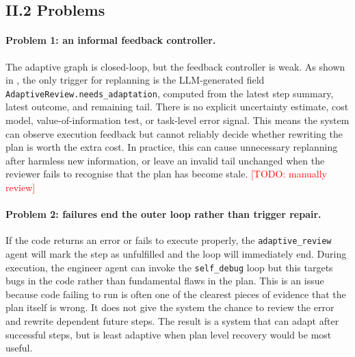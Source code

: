 \documentclass[11pt,a4paper]{article}
\newcommand{\code}[1]{\texttt{#1}}
\newcommand{\TODO}[1]{\textcolor{red}{[TODO: #1]}}
\begin{document}
\subsection*{II.2 Problems}

\paragraph{Problem 1: an informal feedback controller.}
The adaptive graph is closed-loop, but the feedback controller is weak.  As shown in , the only trigger for replanning is the LLM-generated field \code{AdaptiveReview.needs\_adaptation}, computed from the latest step summary, latest outcome, and remaining tail.  There is no explicit uncertainty estimate, cost model, value-of-information test, or task-level error signal.  This means the system can observe execution feedback but cannot reliably decide whether rewriting the plan is worth the extra cost.  In practice, this can cause unnecessary replanning after harmless new information, or leave an invalid tail unchanged when the reviewer fails to recognise that the plan has become stale.
\TODO{manually review}

\paragraph{Problem 2: failures end the outer loop rather than trigger repair.}
If the code returns an error or fails to execute properly, the \code{adaptive\_review} agent will mark the step as unfulfilled and the loop will immediately end. During execution, the engineer agent can invoke the \code{self\_debug} loop but this targets bugs in the code rather than fundamental flaws in the plan. This is an issue because code failing to run is often one of the clearest pieces of evidence that the plan itself is wrong. It does not give the system the chance to review the error and rewrite dependent future steps. The result is a system that can adapt after successful steps, but is least adaptive when plan level recovery would be most useful.
\end{document}
